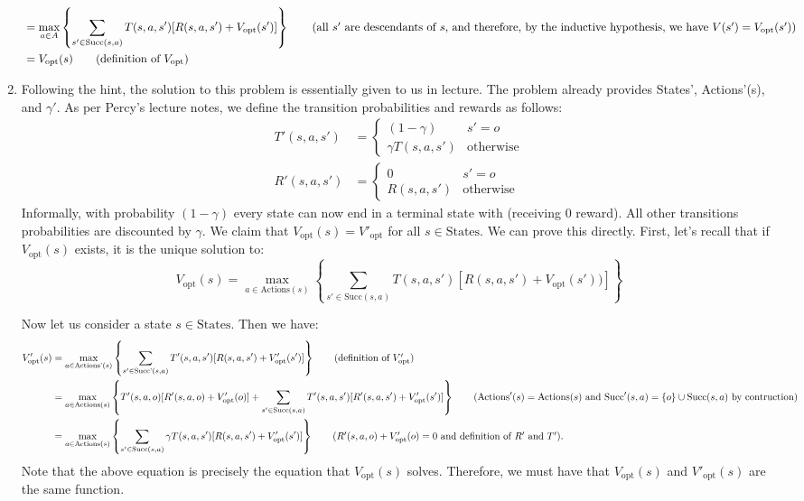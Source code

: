 \documentclass[12pt]{article}
\begin{document}
\begin{enumerate}[label=(\alph*)]
\begin{align*}
    &= \max_{a \in A} \left\{ \sum_{s' \in \text{Succ}(s,a)}T(s,a,s' )[R(s,a,s') + V_{\text{opt}}(s')] \right\} \tag{all $s'$ are descendants of $s$, and therefore, by the inductive hypothesis, we have $V(s') = V_\text{opt}(s')$} \\
    &= V_{\text{opt}}(s) \tag{definition of $V_\text{opt}$}
  \end{align*}
  \item Following the hint, the solution to this problem is essentially given to us in lecture. The problem already provides States', Actions'(s), and $\gamma'$. As per Percy's lecture notes, we define the transition probabilities and rewards as follows:
  \begin{align*}
    T'(s, a, s') &=
      \begin{cases} 
        (1-\gamma) & s' = o \\
        \gamma T(s, a, s') & \text{otherwise}
     \end{cases} \\
    R'(s, a, s') &= 
      \begin{cases} 
        0 & s' = o \\
        R(s, a, s') & \text{otherwise}
      \end{cases}
  \end{align*}
  Informally, with probability $(1-\gamma)$ every state can now end in a terminal state with (receiving $0$ reward). All other transitions probabilities are discounted by $\gamma$. We claim that $V_{\text{opt}}(s) = V'_{\text{opt}}$ for all $s \in \text{States}$. We can prove this directly. First, let's recall that if $V_{\text{opt}}(s)$ exists, it is the unique solution to:
  $$
    V_{\text{opt}}(s) = \max_{a \in \text{Actions}(s)}\left\{ \sum_{s' \in \text{Succ}(s,a)} T(s,a,s')[R(s,a,s
  ') + V_\text{opt}(s'))] \right\}
  $$


  Now let us consider a state $s \in \text{States}$. Then we have:
  \begin{align*}
    V'_{\text{opt}}(s) &= \max_{a \in \text{Actions'}(s)}\left \{ \sum_{s' \in \text{Succ'}(s,a)} T'(s,a,s')[R(s,a,s') + V'_{\text{opt}}(s')] \right\} \tag{definition of $V'_{\text{opt}}$}\\
    &= \max_{a \in \text{Actions}(s)}\left \{ T'(s,a,o)[R'(s,a,o) + V'_{\text{opt}}(o)] + \sum_{s' \in \text{Succ}(s,a)} T'(s,a,s')[R'(s,a,s') + V'_{\text{opt}}(s')] \right\} \tag{$\text{Actions}'(s) = \text{Actions}(s)$ and $\text{Succ}'(s,a) = \{o\} \cup \text{Succ}(s,a)$ by contruction} \\
    &= \max_{a \in \text{Actions}(s)}\left \{ \sum_{s' \in \text{Succ}(s,a)} \gamma T(s,a,s')[R(s,a,s') + V'_{\text{opt}}(s')] \right\} \tag{$R'(s,a,o) + V'_{\text{opt}}(o) = 0$ and definition of $R'$ and $T'$}.
  \end{align*}
  Note that the above equation is precisely the equation that $V_{\text{opt}}(s)$ solves. Therefore, we must have that $V_{\text{opt}}(s)$ and $V'_{\text{opt}}(s)$ are the same function.

\end{enumerate}
\end{document}
